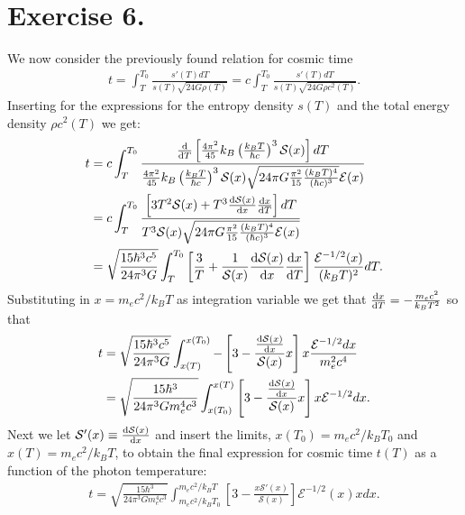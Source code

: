 \documentclass{emulateapj}
\begin{document}
	 \section*{Exercise 6.}
	 We now consider the previously found relation for cosmic time
	 \begin{align}
	 	t = \int_{T}^{T_0}\frac{s'(T)dT}{s(T)\sqrt{24 G\rho(T)}} =c\int_{T}^{T_0}\frac{s'(T)dT}{s(T)\sqrt{24 G\rho c^2(T)}}.
	 \end{align}
	 Inserting for the expressions for the entropy density $s(T)$ and the total energy density $\rho c^2(T)$ we get:
	 \begin{align}
	 	t & = c\int_{T}^{T_0}\frac{\dv{T}\left[\frac{4\pi^2}{45}k_B\left(\frac{k_BT}{\hbar c}\right)^3 \mathcal{S}(x)\right]dT}{\frac{4\pi^2}{45}k_B\left(\frac{k_BT}{\hbar c}\right)^3 \mathcal{S}(x)\sqrt{24\pi G \frac{\pi^2}{15}\frac{(k_BT)^4}{(\hbar c)^3}}\mathcal{E}(x)}\\
	 	& = c \int_{T}^{T_0}\frac{\left[3T^2 \mathcal{S}(x) + T^3\dv{\mathcal{S}(x)}{x}\dv{x}{T}\right]dT}{T^3\mathcal{S}(x)\sqrt{24\pi G \frac{\pi^2}{15}\frac{(k_BT)^4}{(\hbar c)^3}\mathcal{E}(x)}}\\
	 	& = \sqrt{\frac{15\hbar^3c^5}{24\pi^3 G}}\int_{T}^{T_0}\left[\frac{3}{T} + \frac{1}{\mathcal{S}(x)}\dv{\mathcal{S}(x)}{x}\dv{x}{T}\right]\frac{\mathcal{E}^{-1/2}(x)}{(k_BT)^2}dT.
	 \end{align}
	 Substituting in $x = m_ec^2/k_BT$ as integration variable we get that $\dv{x}{T} = -\frac{m_e c^2}{k_BT^2}$ so that
	 \begin{align}
	 	t & = \sqrt{\frac{15\hbar^3c^5}{24\pi^3 G}}\int_{x(T)}^{x(T_0)}-\left[3 - \frac{\dv{\mathcal{S}(x)}{x}}{\mathcal{S}(x)}x\right]x\frac{\mathcal{E}^{-1/2}dx}{m_e^2c^4}\\
	 	& = \sqrt{\frac{15\hbar^3}{24\pi^3 Gm_e^4 c^3}}\int_{x(T_0)}^{x(T)}\left[3 - \frac{\dv{\mathcal{S}(x)}{x}}{\mathcal{S}(x)}x\right]x\mathcal{E}^{-1/2}dx.
	 \end{align}
	 Next we let $\mathcal{S}'(x)\equiv\dv{\mathcal{S}(x)}{x}$ and insert the limits, $x(T_0) = m_ec^2/k_BT_0$ and $x(T) = m_ec^2/k_BT$, to obtain the final expression for cosmic time $t(T)$ as a function of the photon temperature:
	 \begin{align}
	 	t = \sqrt{\frac{15\hbar^3}{24\pi^3 Gm_e^4 c^3}}\int_{m_ec^2/k_BT_0}^{m_ec^2/k_BT}\left[3 - \frac{x\mathcal{S}'(x)}{\mathcal{S}(x)}\right]\mathcal{E}^{-1/2}(x)xdx.
	 \end{align}
	 
	 
\end{document}
